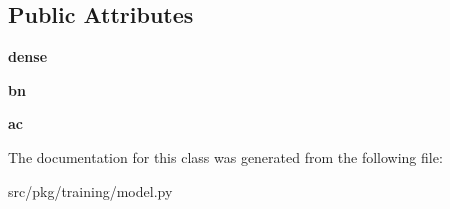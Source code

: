 \subsection*{Public Attributes}
\begin{DoxyCompactItemize}
\item 
\mbox{\label{classrnb-planning_1_1src_1_1pkg_1_1training_1_1model_1_1_dense_b_n_afdd06871dffb1dddcbd52e79e038230b}} 
{\bfseries dense}
\item 
\mbox{\label{classrnb-planning_1_1src_1_1pkg_1_1training_1_1model_1_1_dense_b_n_a4ff0fb79b9d4874c33178f2448e8974a}} 
{\bfseries bn}
\item 
\mbox{\label{classrnb-planning_1_1src_1_1pkg_1_1training_1_1model_1_1_dense_b_n_a08da8a86db0a389fe328d7f980e1a56a}} 
{\bfseries ac}
\end{DoxyCompactItemize}


The documentation for this class was generated from the following file\+:\begin{DoxyCompactItemize}
\item 
src/pkg/training/model.\+py\end{DoxyCompactItemize}
